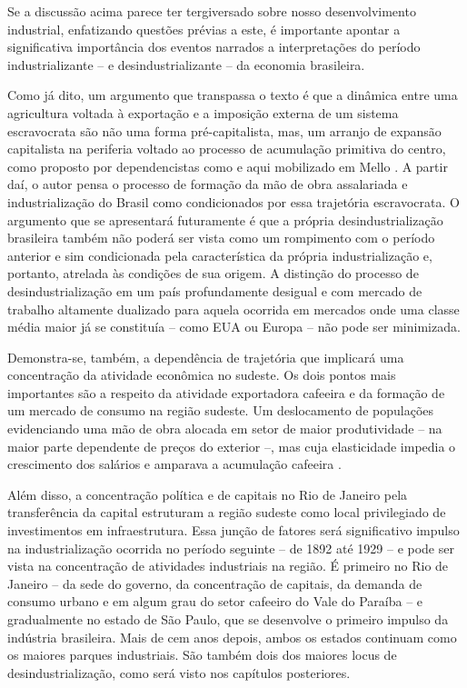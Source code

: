 Se a discussão acima parece ter tergiversado sobre nosso desenvolvimento
industrial, enfatizando questões prévias a este, é importante apontar a
significativa importância dos eventos narrados a interpretações do
período industrializante -- e desindustrializante -- da economia
brasileira.

Como já dito, um argumento que transpassa o texto é que a dinâmica entre
uma agricultura voltada à exportação e a imposição externa de um sistema
escravocrata são não uma forma pré-capitalista, mas, um arranjo de
expansão capitalista na periferia voltado ao processo de acumulação
primitiva do centro, como proposto por dependencistas como 
e aqui mobilizado em Mello \citeyearpar[]{mello1982}. A
partir daí, o autor pensa o processo de formação da mão de obra
assalariada e industrialização do Brasil como condicionados por essa
trajetória escravocrata. O argumento que se apresentará futuramente é
que a própria desindustrialização brasileira também não poderá ser vista
como um rompimento com o período anterior e sim condicionada pela
característica da própria industrialização e, portanto, atrelada às condições de
sua origem. A distinção do processo de desindustrialização em um país
profundamente desigual e com mercado de trabalho altamente dualizado
para aquela ocorrida em mercados onde uma classe média maior já se
constituía -- como EUA ou Europa -- não pode ser minimizada.

Demonstra-se, também, a dependência de trajetória que implicará uma
concentração da atividade econômica no sudeste. Os dois pontos mais
importantes são a respeito da atividade exportadora cafeeira e da
formação de um mercado de consumo na região sudeste. Um deslocamento de
populações evidenciando uma mão de obra alocada em setor de maior
produtividade -- na maior parte dependente de preços do exterior --, mas
cuja elasticidade impedia o crescimento dos salários e amparava a
acumulação cafeeira
\citep{furtado2005}.

Além disso, a concentração política e de capitais no Rio de Janeiro pela
transferência da capital estruturam a região sudeste como local
privilegiado de investimentos em infraestrutura. Essa junção de fatores
será significativo impulso na industrialização ocorrida no período
seguinte -- de 1892 até 1929 -- e pode ser vista na concentração de
atividades industriais na região. É primeiro no Rio de Janeiro -- da
sede do governo, da concentração de capitais, da demanda de consumo
urbano e em algum grau do setor cafeeiro do Vale do Paraíba 
\cite{pedreira_historiografia_2024,barreto_o_2018} -- e gradualmente no estado de São Paulo, que se desenvolve o
primeiro impulso da indústria brasileira. Mais de cem anos depois, ambos
os estados continuam como os maiores parques industriais. São
também dois dos maiores locus de desindustrialização, como será visto nos
capítulos posteriores.

